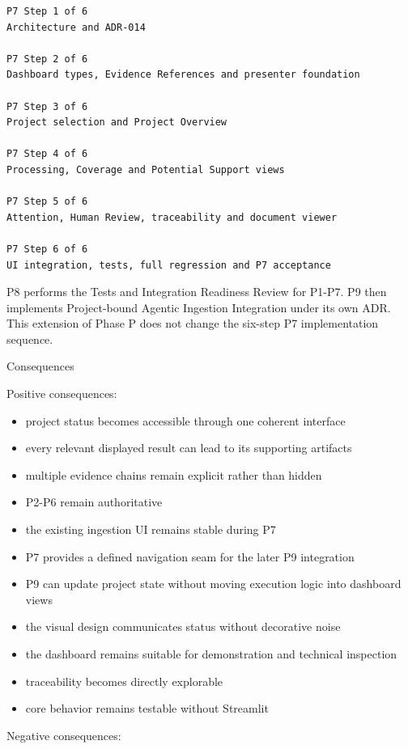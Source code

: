 \begin{verbatim}
P7 Step 1 of 6
Architecture and ADR-014

P7 Step 2 of 6
Dashboard types, Evidence References and presenter foundation

P7 Step 3 of 6
Project selection and Project Overview

P7 Step 4 of 6
Processing, Coverage and Potential Support views

P7 Step 5 of 6
Attention, Human Review, traceability and document viewer

P7 Step 6 of 6
UI integration, tests, full regression and P7 acceptance
\end{verbatim}

P8 performs the Tests and Integration Readiness Review for P1-P7. P9 then implements Project-bound Agentic Ingestion Integration under its own ADR. This extension of Phase P does not change the six-step P7 implementation sequence.

Consequences

Positive consequences:

\begin{itemize}
\tightlist
\item
  project status becomes accessible through one coherent interface
\item
  every relevant displayed result can lead to its supporting artifacts
\item
  multiple evidence chains remain explicit rather than hidden
\item
  P2-P6 remain authoritative
\item
  the existing ingestion UI remains stable during P7
\item
  P7 provides a defined navigation seam for the later P9 integration
\item
  P9 can update project state without moving execution logic into dashboard views
\item
  the visual design communicates status without decorative noise
\item
  the dashboard remains suitable for demonstration and technical inspection
\item
  traceability becomes directly explorable
\item
  core behavior remains testable without Streamlit
\end{itemize}

Negative consequences:

